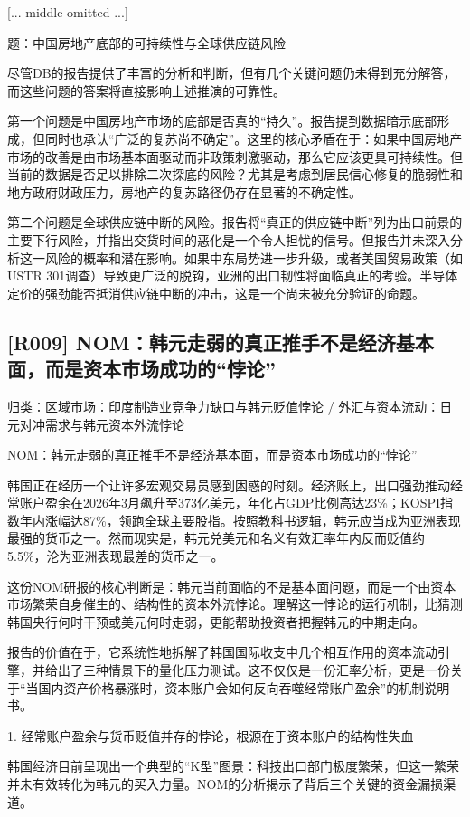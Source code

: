 \documentclass[11pt]{ctexart}
\begin{document}
[... middle omitted ...]

题：中国房地产底部的可持续性与全球供应链风险

尽管DB的报告提供了丰富的分析和判断，但有几个关键问题仍未得到充分解答，而这些问题的答案将直接影响上述推演的可靠性。

第一个问题是中国房地产市场的底部是否真的“持久”。报告提到数据暗示底部形成，但同时也承认“广泛的复苏尚不确定”。这里的核心矛盾在于：如果中国房地产市场的改善是由市场基本面驱动而非政策刺激驱动，那么它应该更具可持续性。但当前的数据是否足以排除二次探底的风险？尤其是考虑到居民信心修复的脆弱性和地方政府财政压力，房地产的复苏路径仍存在显著的不确定性。

第二个问题是全球供应链中断的风险。报告将“真正的供应链中断”列为出口前景的主要下行风险，并指出交货时间的恶化是一个令人担忧的信号。但报告并未深入分析这一风险的概率和潜在影响。如果中东局势进一步升级，或者美国贸易政策（如USTR 301调查）导致更广泛的脱钩，亚洲的出口韧性将面临真正的考验。半导体定价的强劲能否抵消供应链中断的冲击，这是一个尚未被充分验证的命题。

\subsection{[R009] NOM：韩元走弱的真正推手不是经济基本面，而是资本市场成功的“悖论”}
{\small\color{refgray}归类：区域市场：印度制造业竞争力缺口与韩元贬值悖论 / 外汇与资本流动：日元对冲需求与韩元资本外流悖论}

NOM：韩元走弱的真正推手不是经济基本面，而是资本市场成功的“悖论”

韩国正在经历一个让许多宏观交易员感到困惑的时刻。经济账上，出口强劲推动经常账户盈余在2026年3月飙升至373亿美元，年化占GDP比例高达23\%；KOSPI指数年内涨幅达87\%，领跑全球主要股指。按照教科书逻辑，韩元应当成为亚洲表现最强的货币之一。然而现实是，韩元兑美元和名义有效汇率年内反而贬值约5.5\%，沦为亚洲表现最差的货币之一。

这份NOM研报的核心判断是：韩元当前面临的不是基本面问题，而是一个由资本市场繁荣自身催生的、结构性的资本外流悖论。理解这一悖论的运行机制，比猜测韩国央行何时干预或美元何时走弱，更能帮助投资者把握韩元的中期走向。

报告的价值在于，它系统性地拆解了韩国国际收支中几个相互作用的资本流动引擎，并给出了三种情景下的量化压力测试。这不仅仅是一份汇率分析，更是一份关于“当国内资产价格暴涨时，资本账户会如何反向吞噬经常账户盈余”的机制说明书。

1. 经常账户盈余与货币贬值并存的悖论，根源在于资本账户的结构性失血

韩国经济目前呈现出一个典型的“K型”图景：科技出口部门极度繁荣，但这一繁荣并未有效转化为韩元的买入力量。NOM的分析揭示了背后三个关键的资金漏损渠道。
\end{document}
